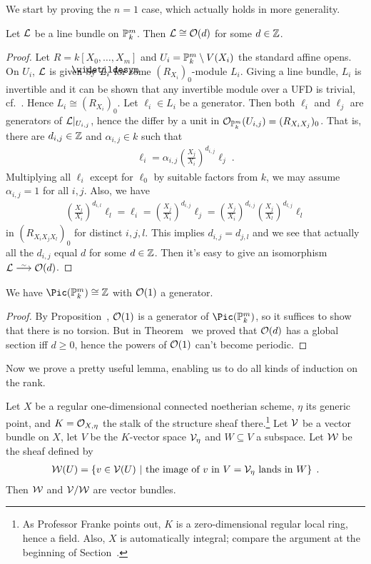 \documentclass[a4paper,parskip=half,numbers=enddot, DIV=12]{scrreprt}
\renewcommand{\geq}{\geqslant}
\begin{document}
We start by proving the $n=1$ case, which actually holds in more generality.
\begin{prop}
	Let $\mathcal{L}$ be a line bundle on $\mathbb{P}_k^m$. Then $\mathcal{L}\cong\mathcal{O}(d)$ for some $d\in\mathbb{Z}$.
\end{prop}
\begin{proof}
	Let $R=k[X_0,\ldots,X_m]$ and $U_i=\mathbb{P}_k^m\setminus V(X_i)$ the standard affine opens. On $U_i$, $\mathcal{L}$ is given by $\snake{L}_i$ for some $(R_{X_i})_0$-module $L_i$. Giving a line bundle, $L_i$ is invertible and it can be shown that any invertible module over a UFD is trivial, cf.\ \cite[]{stacks-project}. Hence $L_i\cong(R_{X_i})_0$. Let $\ell_i\in L_i$ be a generator. Then both $\ell_i$ and $\ell_j$ are generators of $\mathcal{L}|_{U_{i,j}}$, hence the differ by a unit in $\mathcal{O}_{\mathbb{P}_k^m}(U_{i,j})=(R_{X_iX_j})_0$. That is, there are $d_{i,j}\in\mathbb{Z}$ and $\alpha_{i,j}\in k$ such that
	\begin{align*}
		\ell_i=\alpha_{i,j} \left(\frac{X_j}{X_i}\right)^{d_{i,j}} \ell_j\;.
	\end{align*}
	Multiplying all $\ell_i$ except for $\ell_0$ by suitable factors from $k$, we may assume $\alpha_{i,j}=1$ for all $i,j$. Also, we have
	\begin{align*}
		\left(\frac{X_l}{X_i}\right)^{d_{i,l}}\ell_l=\ell_i=\left(\frac{X_j}{X_i}\right)^{d_{i,j}}\ell_j=\left(\frac{X_j}{X_i}\right)^{d_{i,j}}\left(\frac{X_j}{X_l}\right)^{d_{l,j}}\ell_l
	\end{align*}
	in $(R_{X_iX_jX_l})_0$ for distinct $i,j,l$. This implies $d_{i,j}=d_{j,l}$ and we see that actually all the $d_{i,j}$ equal $d$ for some $d\in\mathbb{Z}$. Then it's easy to give an isomorphism $\Ll\isomorphism\Oo(d)$.
\end{proof}
\begin{cor}
	We have $\Pic(\IP_k^m)\cong \IZ$ with $\mathcal{O}(1)$ a generator.
\end{cor}
\begin{proof}
	By Proposition~, $\mathcal{O}(1)$ is a generator of $\Pic(\IP_k^m)$, so it suffices to show that there is no torsion. But in Theorem~ we proved that $\mathcal{O}(d)$ has a global section iff $d\geq 0$, hence the powers of $\mathcal{O}(1)$ can't become periodic.
\end{proof}
Now we prove a pretty useful lemma, enabling us to do all kinds of induction on the rank.
\begin{lem}
	Let $X$ be a regular one-dimensional connected noetherian scheme, $\eta$ its generic point, and $K=\mathcal{O}_{X,\eta}$ the stalk of the structure sheaf there.\footnote{As Professor Franke points out, $K$ is a zero-dimensional regular local ring, hence a field. Also, $X$ is automatically integral; compare the argument at the beginning of Section~.} Let $\mathcal{V}$ be a vector bundle on $X$, let $V$ be the $K$-vector space $\mathcal{V}_\eta$ and $W\subseteq V$ a subspace. Let $\mathcal{W}$ be the sheaf defined by
	\begin{align*}
		\mathcal{W}(U)=\left\{v\in\mathcal{V}(U)\ \middle|\ \text{the image of }v\text{ in }V=\mathcal{V}_\eta\text{ lands in }W\right\}\;.
	\end{align*}
	Then $\mathcal{W}$ and $\mathcal{V}/\mathcal{W}$ are vector bundles.
\end{lem}
\end{document}
